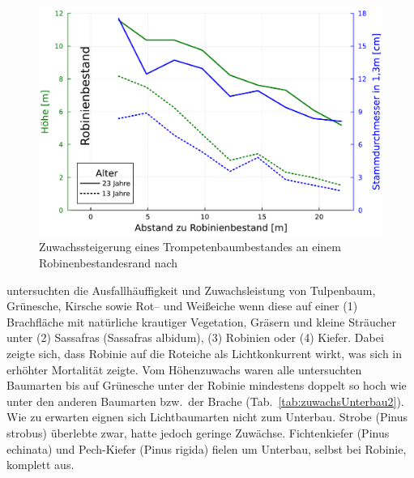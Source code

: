 \documentclass[twocolumn]{scrartcl}
\begin{document}
\begin{figure}[htbp]
  \centering
  \includegraphics[width=.9\linewidth]{./bild/bestandesrand}
  \caption{Zuwachssteigerung eines Trompetenbaumbestandes an einem
    Robinenbestandesrand nach
    \citet{ferguson1922robinie,chapman1935robinie}}
  \label{fig:bestandesrand}
\end{figure}

\citet{chapman1951robinieSchirm} untersuchten die Ausfallhäuffigkeit
und Zuwachsleistung von Tulpenbaum, Grünesche, Kirsche sowie Rot-- und
Weißeiche wenn diese auf einer (1) Brachfläche mit natürliche
krautiger Vegetation, Gräsern und kleine Sträucher unter (2) Sassafras
(Sassafras albidum), (3) Robinien oder (4) Kiefer. Dabei zeigte sich,
dass Robinie auf die Roteiche als Lichtkonkurrent wirkt, was sich in
erhöhter Mortalität zeigte. Vom Höhenzuwachs waren alle untersuchten
Baumarten bis auf Grünesche unter der Robinie mindestens doppelt so
hoch wie unter den anderen Baumarten bzw.\ der Brache
(Tab.~\ref{tab:zuwachsUnterbau2}). Wie zu erwarten eignen sich
Lichtbaumarten nicht zum Unterbau. Strobe (Pinus strobus) überlebte
zwar, hatte jedoch geringe Zuwächse. Fichtenkiefer (Pinus echinata)
und Pech-Kiefer (Pinus rigida) fielen um Unterbau, selbst bei Robinie,
komplett aus.
\end{document}
